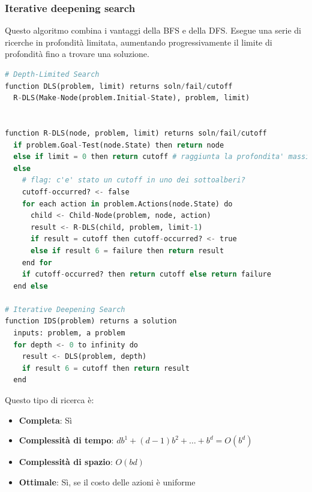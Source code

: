 \documentclass[a4paper]{article}
\begin{document}
\subsubsection{Iterative deepening search}
Questo algoritmo combina i vantaggi della BFS e della DFS. Esegue una serie di ricerche
in profondità limitata, aumentando progressivamente il limite di profondità fino a
trovare una soluzione.
\begin{lstlisting}[language=Python]
# Depth-Limited Search
function DLS(problem, limit) returns soln/fail/cutoff
  R-DLS(Make-Node(problem.Initial-State), problem, limit)


function R-DLS(node, problem, limit) returns soln/fail/cutoff
  if problem.Goal-Test(node.State) then return node
  else if limit = 0 then return cutoff # raggiunta la profondita' massima
  else
    # flag: c'e' stato un cutoff in uno dei sottoalberi?
    cutoff-occurred? <- false
    for each action in problem.Actions(node.State) do
      child <- Child-Node(problem, node, action)
      result <- R-DLS(child, problem, limit-1)
      if result = cutoff then cutoff-occurred? <- true
      else if result 6 = failure then return result
    end for
    if cutoff-occurred? then return cutoff else return failure
  end else

# Iterative Deepening Search
function IDS(problem) returns a solution
  inputs: problem, a problem
  for depth <- 0 to infinity do
    result <- DLS(problem, depth)
    if result 6 = cutoff then return result
  end
\end{lstlisting}
Questo tipo di ricerca è:
\begin{itemize}
  \item \textbf{Completa}: Sì
  \item \textbf{Complessità di tempo}: \( db^1 + (d-1)b^2 + \ldots + b^d = O(b^d) \) 
  \item \textbf{Complessità di spazio}: \( O(bd) \) 
  \item \textbf{Ottimale}: Sì, se il costo delle azioni è uniforme
\end{itemize}
\end{document}
